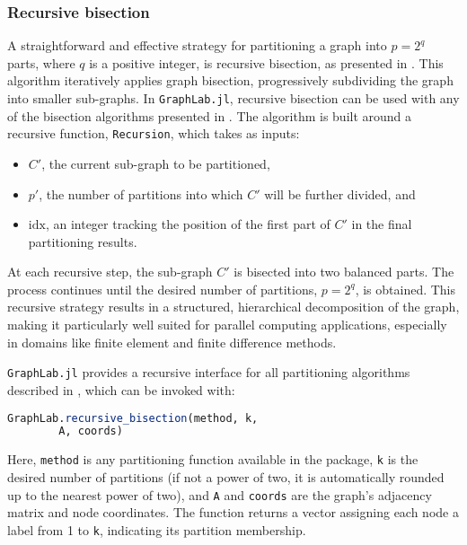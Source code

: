 \documentclass[../paper.tex]{subfiles}
\begin{document}
    \subsubsection{Recursive bisection}
    \label{subsub:rec_bi}
    A straightforward and effective strategy for partitioning a graph into $p = 2^q$ parts,
    where $q$ is a positive integer, is recursive bisection, as presented in .
    This algorithm iteratively applies graph bisection, progressively
    subdividing the graph into smaller sub-graphs.
    In \texttt{GraphLab.jl}, recursive bisection can be used with any of the bisection algorithms presented in .
    The algorithm is built around a recursive function, \texttt{Recursion}, which takes as inputs:
    \begin{itemize}
        \item $C'$, the current sub-graph to be partitioned,
        \item $p'$, the number of partitions into which $C'$ will be further divided, and
        \item $\mathrm{idx}$, an integer tracking the position of the first part of $C'$ in the final partitioning results.
    \end{itemize}
    
    At each recursive step, the sub-graph $C'$ is bisected into two balanced parts. The process continues
    until the desired number of partitions, $p = 2^q$, is obtained. This recursive strategy results in a structured,
    hierarchical decomposition of the graph, making it particularly well suited for parallel computing applications, especially in domains like finite element and finite difference methods\cite{doi:10.1137/S1064827593255135}. 
    
    

    \texttt{GraphLab.jl} provides a recursive interface for all partitioning algorithms described in , which can be invoked with:

    \begin{lstlisting}[language=Julia]
    GraphLab.recursive_bisection(method, k, 
        A, coords)
    \end{lstlisting}

    Here, \texttt{method} is any partitioning function available in the package, \texttt{k} is the desired number of partitions (if not a power of two, it is automatically rounded up to the nearest power of two), and \texttt{A} and \texttt{coords} are the graph's adjacency matrix and node coordinates. The function returns a vector assigning each node a label from 1 to \texttt{k}, indicating its partition membership.
\end{document}
